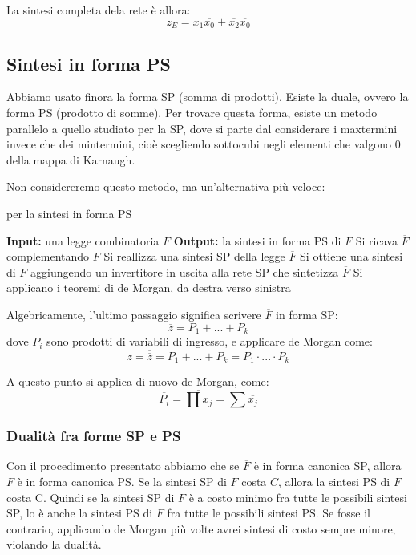 \documentclass[a4paper,11pt]{article}
\begin{document}
La sintesi completa dela rete è allora:
$$ z_E = x_1 \overline{x_0} + \overline{x_2}\overline{x_0} $$

\subsection{Sintesi in forma PS}
Abbiamo usato finora la forma SP (somma di prodotti).
Esiste la duale, ovvero la forma PS (prodotto di somme).
Per trovare questa forma, esiste un metodo parallelo a quello studiato per la SP, dove si parte dal considerare i maxtermini invece che dei mintermini, cioè scegliendo sottocubi negli elementi che valgono 0 della mappa di Karnaugh.

Non considereremo questo metodo, ma un'alternativa più veloce:

\begin{algorithm}
\caption{per la sintesi in forma PS}
\begin{algorithmic}
	\STATE \textbf{Input:} una legge combinatoria $F$
	\STATE \textbf{Output:} la sintesi in forma PS di $F$
	\STATE Si ricava $\overline{F}$ complementando $F$
	\STATE Si reallizza una sintesi SP della legge $\overline{F}$
	\STATE Si ottiene una sintesi di $F$ aggiungendo un invertitore in uscita alla rete SP che sintetizza $\overline{F}$
	\STATE Si applicano i teoremi di de Morgan, da destra verso sinistra
\end{algorithmic}
\end{algorithm}

Algebricamente, l'ultimo passaggio significa scrivere $\overline{F}$ in forma SP:
$$
\overline{z} = P_1 + ... + P_k
$$
dove $P_i$ sono prodotti di variabili di ingresso, e applicare de Morgan come:
$$
z = \overline{\overline{z}} = \overline{P_1 + ... + P_k} = \overline{P_1} \cdot ... \cdot \overline{P_k}
$$

A questo punto si applica di nuovo de Morgan, come:
$$
\overline{P_i} = \overline{\prod x_j} = \sum \overline{x_j}
$$

\subsubsection{Dualità fra forme SP e PS}
Con il procedimento presentato abbiamo che se $\overline{F}$ è in forma canonica SP, allora $F$ è in forma canonica PS.
Se la sintesi SP di $\overline{F}$ costa $C$, allora la sintesi PS di $F$ costa C.
Quindi se la sintesi SP di $\overline{F}$ è a costo minimo fra tutte le possibili sintesi SP, lo è anche la sintesi PS di $F$ fra tutte le possibili sintesi PS.
Se fosse il contrario, applicando de Morgan più volte avrei sintesi di costo sempre minore, violando la dualità.
\end{document}

